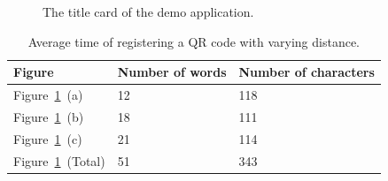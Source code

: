 	\begin{figure}[H]%
		\centering
   		 \qquad
   		 \qquad
   		 \qquad
		\caption{The title card of the demo application.}
		\label{glassTestTextLengthS2Columns}
	\end{figure}

	\begin{table}[ht!]
    		\caption{Average time of registering a QR code with varying distance.} \label{tab:glassTestTextLengthS2ColumnsTable}
		\centering \begin{tabularx}{\textwidth}{l|X|X} \hline
		\textbf{Figure} & \textbf{Number of words} & \textbf{Number of characters} \\ \hline \hline
       
		Figure~\ref{glassTestTextLengthS2Columns}~(a)	&12	&118	\\ \hline
		Figure~\ref{glassTestTextLengthS2Columns}~(b)	&18	&111	\\ \hline
		Figure~\ref{glassTestTextLengthS2Columns}~(c)	&21	&114	\\ \hline
		Figure~\ref{glassTestTextLengthS2Columns}~(Total)	&51	&343	\\ \hline
		
		\end{tabularx}
	\end{table}

